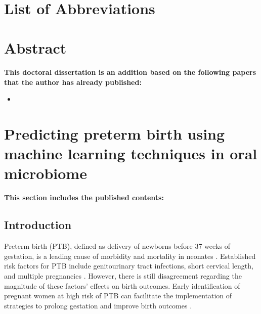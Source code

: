 \documentclass[11pt, a4paper, onecolumn, oneside]{report}
\begin{document}
\hbox{ }
\thispagestyle{empty}
\clearpage

\tableofcontents{}
\thispagestyle{empty}
\vfill
\clearpage

\listoffigures{}
\thispagestyle{empty}
\clearpage

\listoftables{}
\thispagestyle{empty}
\clearpage

\setcounter{page}{1}

    \section*{List of Abbreviations}
    \printacronyms[display=all, heading=none]
    \newpage

    \section{Abstract}

    \textbf{This doctoral dissertation is an addition based on the following papers that the author has already published:}
    \begin{itemize}
        \item  \nocite{PTB-JW-1}
    \end{itemize}
    \newpage

    \section{Predicting preterm birth using machine learning techniques in oral microbiome}
        \label{section:PTB}

        \textbf{This section includes the published contents:} \\
         \nocite{PTB-JW-1}

        \subsection{Introduction}
            Preterm birth (PTB), defined as delivery of newborns before 37 weeks of gestation, is a leading cause of morbidity and mortality in neonates \cite{PTB-rate-1}. Established risk factors for PTB include genitourinary tract infections, short cervical length, and multiple pregnancies \cite{PTB-cause-1}. However, there is still disagreement regarding the magnitude of these factors’ effects on birth outcomes. Early identification of pregnant women at high risk of PTB can facilitate the implementation of strategies to prolong gestation and improve birth outcomes \cite{PTB-care-1}.
\end{document}
